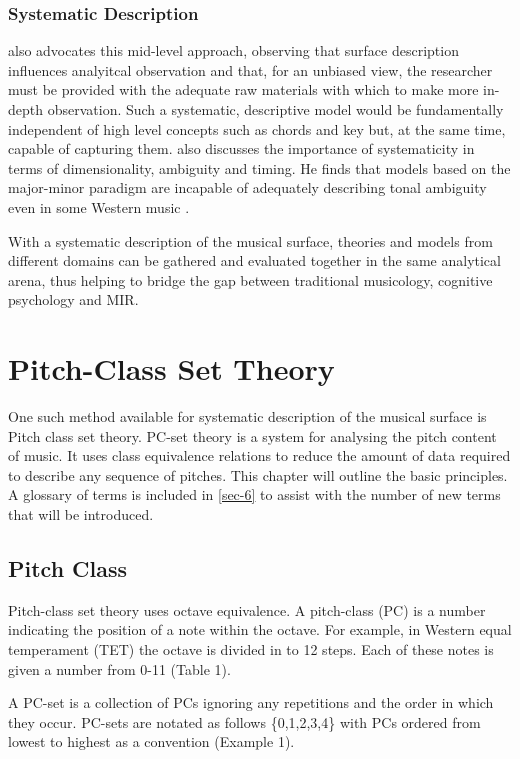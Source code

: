 \documentclass{article}
\begin{document}
\subsubsection{Systematic Description}
\label{sec-2-4-2}

\citet{Martorell2013} also advocates this mid-level approach,
observing that surface description influences analyitcal observation
and that, for an unbiased view, the researcher must be provided with
the adequate raw materials with which to make more in-depth
observation. Such a systematic, descriptive model would be
fundamentally independent of high level concepts such as chords and
key but, at the same time, capable of capturing
them. \citet{Martorell2013} also discusses the importance of
systematicity in terms of dimensionality, ambiguity and timing. He
finds that models based on the major-minor paradigm are incapable of
adequately describing tonal ambiguity even in some Western music
\citep[chap. 3]{Martorell2013}.

With a systematic description of the musical surface, theories and
models from different domains can be gathered and evaluated together in
the same analytical arena, thus helping to bridge the gap between
traditional musicology, cognitive psychology and MIR.
\section{Pitch-Class Set Theory}
\label{sec-3}

One such method available for systematic description of the musical
surface is Pitch class set theory. PC-set theory is a system for
analysing the pitch content of music. It uses class equivalence
relations to reduce the amount of data required to describe any
sequence of pitches. This chapter will outline the basic principles. A
glossary of terms is included in \ref{sec-6} to assist with
the number of new terms that will be introduced.
\subsection{Pitch Class}
\label{sec-3-1}

Pitch-class set theory uses octave equivalence. A pitch-class (PC) is
a number indicating the position of a note within the octave. For
example, in Western equal temperament (TET) the octave is divided in
to 12 steps. Each of these notes is given a number from 0-11 (Table
1).

A PC-set is a collection of PCs ignoring any repetitions and the order
in which they occur. PC-sets are notated as follows \{0,1,2,3,4\} with
PCs ordered from lowest to highest as a convention (Example 1).
\end{document}

